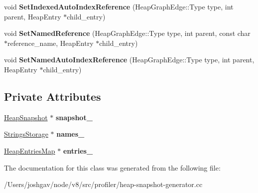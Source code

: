 \begin{DoxyCompactItemize}
\item 
void {\bfseries Set\+Indexed\+Auto\+Index\+Reference} (Heap\+Graph\+Edge\+::\+Type type, int parent, Heap\+Entry $\ast$child\+\_\+entry)\hypertarget{classv8_1_1internal_1_1_snapshot_filler_a90de312519ccebf2a5161c83ee3f07e0}{}\label{classv8_1_1internal_1_1_snapshot_filler_a90de312519ccebf2a5161c83ee3f07e0}

\item 
void {\bfseries Set\+Named\+Reference} (Heap\+Graph\+Edge\+::\+Type type, int parent, const char $\ast$reference\+\_\+name, Heap\+Entry $\ast$child\+\_\+entry)\hypertarget{classv8_1_1internal_1_1_snapshot_filler_a8eac46edf338b70ce71ba9e0f3b6d6e6}{}\label{classv8_1_1internal_1_1_snapshot_filler_a8eac46edf338b70ce71ba9e0f3b6d6e6}

\item 
void {\bfseries Set\+Named\+Auto\+Index\+Reference} (Heap\+Graph\+Edge\+::\+Type type, int parent, Heap\+Entry $\ast$child\+\_\+entry)\hypertarget{classv8_1_1internal_1_1_snapshot_filler_a9684fe34c03774b631a709ac0120caf2}{}\label{classv8_1_1internal_1_1_snapshot_filler_a9684fe34c03774b631a709ac0120caf2}

\end{DoxyCompactItemize}
\subsection*{Private Attributes}
\begin{DoxyCompactItemize}
\item 
\hyperlink{classv8_1_1internal_1_1_heap_snapshot}{Heap\+Snapshot} $\ast$ {\bfseries snapshot\+\_\+}\hypertarget{classv8_1_1internal_1_1_snapshot_filler_ab7d5cc884fb38606d42eea292da95075}{}\label{classv8_1_1internal_1_1_snapshot_filler_ab7d5cc884fb38606d42eea292da95075}

\item 
\hyperlink{classv8_1_1internal_1_1_strings_storage}{Strings\+Storage} $\ast$ {\bfseries names\+\_\+}\hypertarget{classv8_1_1internal_1_1_snapshot_filler_ab44ea2d06499bfa186f9f4f39c63ec19}{}\label{classv8_1_1internal_1_1_snapshot_filler_ab44ea2d06499bfa186f9f4f39c63ec19}

\item 
\hyperlink{classv8_1_1internal_1_1_heap_entries_map}{Heap\+Entries\+Map} $\ast$ {\bfseries entries\+\_\+}\hypertarget{classv8_1_1internal_1_1_snapshot_filler_ab1ac8588b2cfed4c35721ba3699a1864}{}\label{classv8_1_1internal_1_1_snapshot_filler_ab1ac8588b2cfed4c35721ba3699a1864}

\end{DoxyCompactItemize}


The documentation for this class was generated from the following file\+:\begin{DoxyCompactItemize}
\item 
/\+Users/joshgav/node/v8/src/profiler/heap-\/snapshot-\/generator.\+cc\end{DoxyCompactItemize}

